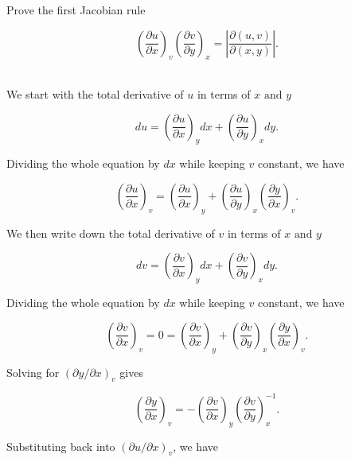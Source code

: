 \documentclass[english,a4paper,12pt]{report}
\begin{document}
{Prove the first Jacobian rule 

\begin{equation}
	\left( \frac{\partial u}{\partial x}  \right)_{v} \left( \frac{\partial v}{\partial y}  \right)_{x} = \left| \frac{\partial (u,v)}{\partial (x,y)} \right|.
\end{equation}
~
}
{We start with the total derivative of \(u\) in terms of \(x \text { and } y\)

\begin{equation}
	du = \left( \frac{\partial u}{\partial x}  \right)_{y} dx + \left( \frac{\partial u}{\partial y} \right)_{x} dy.  
\end{equation}

Dividing the whole equation by \(dx\) while keeping \(v\) constant, we have

\begin{equation}
	\left( \frac{\partial u}{\partial x}  \right)_{v} = \left( \frac{\partial u}{\partial x}  \right)_{y} + \left( \frac{\partial u}{\partial y}  \right)_{x} \left( \frac{\partial y}{\partial x}  \right)_{v}. 
\end{equation}

We then write down the total derivative of \(v\) in terms of \(x \text { and } y\)

\begin{equation}
	dv = \left( \frac{\partial v}{\partial x}  \right)_{y} dx + \left( \frac{\partial v}{\partial y}  \right)_{x} dy.  
\end{equation}

Dividing the whole equation by \(dx\) while keeping \(v\) constant, we have

\begin{equation}
	\left( \frac{\partial v}{\partial x}  \right)_{v}  =0 = \left( \frac{\partial v}{\partial x}  \right)_{y} + \left( \frac{\partial v}{\partial y}  \right)_{x} \left( \frac{\partial y}{\partial x}  \right)_{v}.    
\end{equation}

Solving for \(\left( \partial y /\partial x \right)_{v} \) gives

\begin{equation}
	\left( \frac{\partial y}{\partial x}  \right)_{v} = -\left( \frac{\partial v}{\partial x}  \right)_{y} \left( \frac{\partial v}{\partial y}  \right)^{-1} _{x}.  
\end{equation}

Substituting back into \(\left( \partial u/\partial x \right)_{v} \), we have

}
\end{document}
